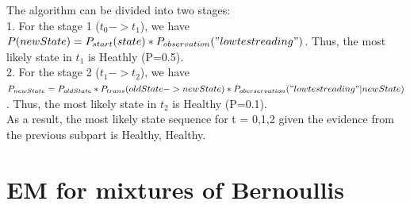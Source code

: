 \documentclass[paper=a4, fontsize=11pt]{scrartcl} %
\numberwithin{equation}{section} %
\numberwithin{figure}{section} %
\numberwithin{table}{section} %
\begin{document}
The algorithm can be divided into two stages:
\\1. For the stage 1 ($t_{0}->t_{1}$), we have $P(newState)=P_{start}(state) * P_{observation}("low test reading")$. Thus, the most likely state in $t_{1}$ is Heathly (P=0.5).
\\2. For the stage 2 ($t_{1}->t_{2}$), we have $P_{newState} = P_{oldState} * P_{trans}(oldState->newState) * P_{oberservation}("low test reading" | newState)$. Thus, the most likely state in $t_{2}$ is Healthy (P=0.1).
\\As a result, the most likely state sequence for t = 0,1,2 given the evidence from the previous subpart is {Healthy, Healthy}.

\section{EM for mixtures of Bernoullis}
\end{document}
